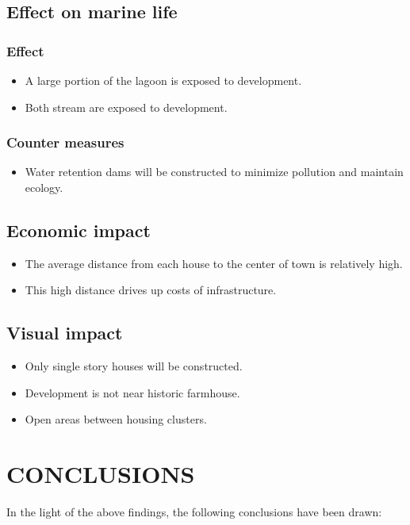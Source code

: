 \documentclass{article}
\begin{document}
\subsection{Effect on marine life}
\subsubsection{Effect}
\begin{itemize}
	\item A large portion of the lagoon is exposed to development.
	\item Both stream are exposed to development.
\end{itemize}

\subsubsection{Counter measures}
\begin{itemize}
	\item Water retention dams will be constructed to minimize pollution and maintain ecology.
\end{itemize}

\subsection{Economic impact}
\begin{itemize}
	\item The average distance from each house to the center of town is relatively high.
	\item This high distance drives up costs of infrastructure.
\end{itemize}

\subsection{Visual impact}
\begin{itemize}
	\item Only single story houses will be constructed.
	\item Development is not near historic farmhouse.
	\item Open areas between housing clusters.
\end{itemize}

\newpage
\section{CONCLUSIONS}
In the light of the above findings, the following conclusions have been drawn:
\end{document}
